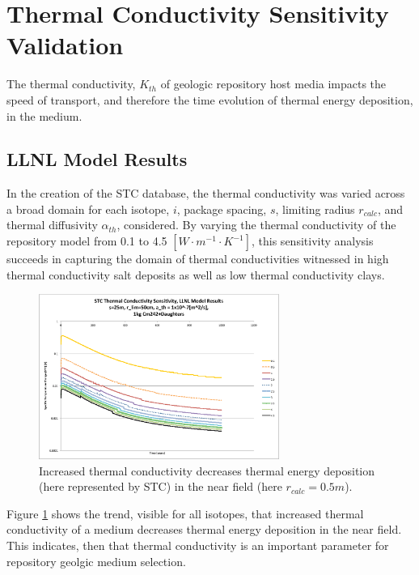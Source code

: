 \section{Thermal Conductivity Sensitivity Validation}\label{sec:conductivity}
The thermal conductivity, $K_{th}$ of geologic repository host media impacts 
the speed of transport, and therefore the time evolution of thermal energy 
deposition, in the medium. 

\subsection{LLNL Model Results}
In the creation of the \gls{STC} database, the thermal conductivity was varied 
across a broad domain for each isotope, $i$, package spacing, $s$, limiting 
radius $r_{calc}$, and thermal diffusivity $\alpha_{th}$, considered.  By 
varying the thermal conductivity of the repository model from 0.1 to 4.5
$[W\cdot m^{-1} \cdot K^{-1}]$, this sensitivity analysis succeeds in capturing the domain of 
thermal conductivities witnessed in high thermal conductivity salt deposits as 
well as low thermal conductivity clays.

\begin{figure}[htbp!]
\begin{center}
\includegraphics[width=0.7\textwidth]{./chapters/demonstration/conductivity/Cm242kth_alpha_low.eps}
\end{center}
\caption[$K_{th}$ Sensitivity for Low $\alpha_{th}$ in LLNL Model]{Increased thermal conductivity decreases thermal energy deposition 
(here represented by \gls{STC}) in the near field (here $r_{calc} = 0.5m$).}
\label{fig:Cm242Kth_alpha_low}
\end{figure}


Figure \ref{fig:Cm242Kth_alpha_low} shows the trend, visible for all isotopes, 
that increased thermal conductivity of a medium decreases thermal energy 
deposition in the near field. This indicates, then that thermal conductivity is 
an important parameter for repository geolgic medium selection. 

